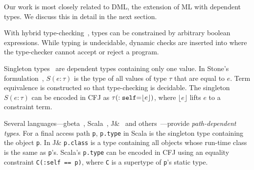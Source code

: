 
Our work is most closely related to DML, the extension of ML with dependent types. We discuss this in detail in the next section.



With hybrid type-checking~\cite{flanagan-popl06,flanagan-fool06},
types can be constrained by arbitrary boolean expressions.
While typing is undecidable, dynamic checks are inserted into
where the type-checker cannot accept or reject a program.


Singleton types~\cite{aspinall-singletons,stone00} are dependent
types containing only one value.  
In Stone's formulation~\cite{stone00},
$S(e : \tau)$
is the type of all values of type $\tau$ that are equal to $e$.
Term equivalence is
constructed so that type-checking is decidable.
The singleton $S(e: \tau)$ can be encoded in CFJ as
$\tau(:{\tt self} {\tt =} \lfloor e \rfloor)$, where 
$\lfloor e \rfloor$ lifts $e$ to a constraint term.



Several languages---gbeta~\cite{ernst99-gbeta},
Scala~\cite{scala-overview,scala-oopsla05}, J\&~\cite{nqm06} and
others~\cite{oz01,ocrz-ecoop03}---provide {\em path-dependent
types}.  For a final access path {\tt p}, {\tt p.type}
in Scala is the singleton type containing the object {\tt p}.
In J\& {\tt p.class} is a type containing all objects
whose run-time class is the same as {\tt p}'s.
Scala's {\tt p.type} can be encoded in CFJ using an equality
constraint {\tt C(:self == p)}, where {\tt C} is a supertype of
{\tt p}'s static type.


